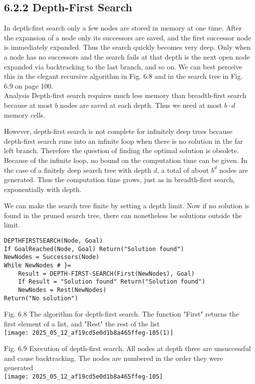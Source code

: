\documentclass[10pt]{article}
\begin{document}
\subsection*{6.2.2 Depth-First Search}
In depth-first search only a few nodes are stored in memory at one time. After the expansion of a node only its successors are saved, and the first successor node is immediately expanded. Thus the search quickly becomes very deep. Only when a node has no successors and the search fails at that depth is the next open node expanded via backtracking to the last branch, and so on. We can best perceive this in the elegant recursive algorithm in Fig. 6.8 and in the search tree in Fig. 6.9 on page 100.\\
Analysis Depth-first search requires much less memory than breadth-first search because at most $b$ nodes are saved at each depth. Thus we need at most $b \cdot d$ memory cells.

However, depth-first search is not complete for infinitely deep trees because depth-first search runs into an infinite loop when there is no solution in the far left branch. Therefore the question of finding the optimal solution is obsolete. Because of the infinite loop, no bound on the computation time can be given. In the case of a finitely deep search tree with depth $d$, a total of about $b^{d}$ nodes are generated. Thus the computation time grows, just as in breadth-first search, exponentially with depth.

We can make the search tree finite by setting a depth limit. Now if no solution is found in the pruned search tree, there can nonetheless be solutions outside the limit.

\begin{verbatim}
DEPTHFIRSTSEARCH(Node, Goal)
If GoalReached(Node, Goal) Return("Solution found")
NewNodes = Successors(Node)
While NewNodes # }=
    Result = DEPTH-FIRST-SEARCH(First(NewNodes), Goal)
    If Result = "Solution found" Return("Solution found")
    NewNodes = Rest(NewNodes)
Return("No solution")
\end{verbatim}

Fig. 6.8 The algorithm for depth-first search. The function "First" returns the first element of a list, and "Rest" the rest of the list\\
\texttt{[image: 2025\_05\_12\_af19cd5e0d1b8a465ffeg-105(1)]}

Fig. 6.9 Execution of depth-first search. All nodes at depth three are unsuccessful and cause backtracking. The nodes are numbered in the order they were generated\\
\texttt{[image: 2025\_05\_12\_af19cd5e0d1b8a465ffeg-105]}
\end{document}
